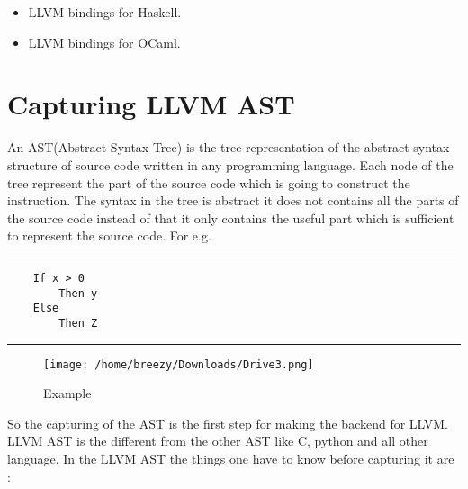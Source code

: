 \documentclass[openany]{book}
\begin{document}
	\begin{itemize}
		\item LLVM bindings for Haskell.
		\item LLVM bindings for OCaml.
	\end{itemize}

\chapter{Capturing LLVM AST }
An AST(Abstract Syntax Tree) is the tree representation of the abstract syntax structure of source code written in any programming language. Each node of the tree represent the part of the source code which is going to construct the instruction. The syntax in the tree is abstract it does not contains all the parts of the source code instead of that it only contains the useful part which is sufficient to represent the source code. For e.g.\newline

\noindent\rule{12cm}{0.4pt}

\begin{verbatim}
	If x > 0
		Then y
	Else
		Then Z 	
\end{verbatim}

\noindent\rule{12cm}{0.4pt} \newline


\begin{figure}
	\texttt{[image: /home/breezy/Downloads/Drive3.png]}
	\caption{Example}
	\label{fig:3.1}
\end{figure}

So the capturing of the AST is the first step for making the backend for LLVM. LLVM AST is the different from the other AST like C, python and all other language. In the LLVM AST the things one have to know before capturing it are :
\end{document}
